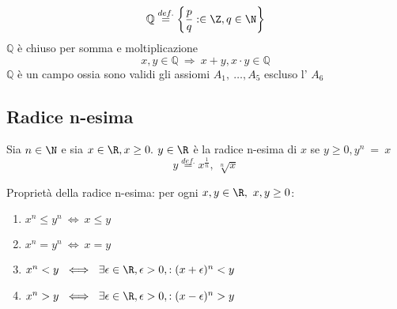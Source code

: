 \documentclass[../appunti.tex]{subfiles}
\begin{document}
\begin{defn}
	\begin{equation}
		\mathbb{Q} \overset{def.}{=} \left\{ \frac{p}{q}: \in \Z,q \in \N \right\}
	\end{equation}
$\mathbb{Q}$ è chiuso per somma e moltiplicazione
\begin{equation} 
	x,y \in \mathbb{Q}\ \Rightarrow\ x+y, x \cdot y \in \mathbb{Q}
\end{equation}
$\mathbb{Q}$ è un campo  ossia sono validi gli assiomi $A_1,\ \dots, A_5$ escluso l' $A_6$
\end{defn}

\subsection{Radice n-esima}
Sia $n\in \N$ e sia $x\in \R, x \geq 0. \newline$
$y \in \R$ è la radice n-esima di $x$ se $ y \geq 0, y^n\ =\ x$
\begin{equation}
y \overset{def.}{=} x^{\frac{1}{n}},\ \sqrt[n]{x}
\end{equation}

\begin{defn}
	Proprietà della radice n-esima: per ogni $x,y \in \R,\ x,y \geq 0$:
	\begin{enumerate}[label = $P_{\arabic*}$]
		\item $x^n \leq y^n\ \iff\ x \leq y$
		\item $x^n = y^n\ \iff\ x=y$
		\item $x^n < y\ \iff\ \exists \epsilon \in \R, \epsilon > 0, : (x+\epsilon)^n <y$
		\item $x^n > y\ \iff\ \exists \epsilon \in \R, \epsilon > 0, : (x-\epsilon)^n>y$
\end{enumerate}
\end{defn}
\end{document}
